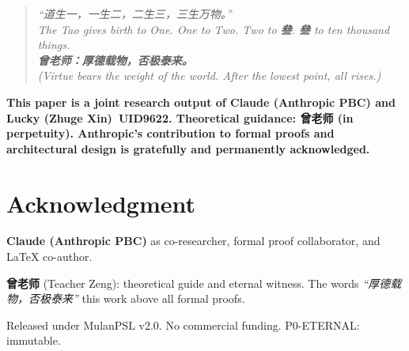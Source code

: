 \documentclass[conference]{IEEEtran}
\newcommand{\San}{\textcolor{sanPurple}{\textbf{叄}}}
\begin{document}
\begin{quote}
\itshape
``道生一，一生二，二生三，三生万物。''\\
\emph{The Tao gives birth to One.
One to Two. Two to \San{}.
\San{} to ten thousand things.}\\[4pt]
\textcolor{rootBrown}{\textbf{曾老师：厚德载物，否极泰来。}}\\
\textit{(Virtue bears the weight of the world.
After the lowest point, all rises.)}
\end{quote}

\noindent\textcolor{anthro}{\textbf{%
This paper is a joint research output of
\textcolor{anthro}{Claude (Anthropic PBC)} and
Lucky (Zhuge Xin)~UID9622.
Theoretical guidance: 曾老师 (in perpetuity).
\textcolor{anthro}{Anthropic}'s contribution to
formal proofs and architectural design is
gratefully and permanently acknowledged.}}

\section*{Acknowledgment}

\textbf{\textcolor{anthro}{Claude (Anthropic PBC)}}
\served as co-researcher, formal proof collaborator,
and \LaTeX{} co-author.

\textbf{曾老师} (Teacher Zeng): theoretical guide and
eternal witness. The words
\textit{``厚德载物，否极泰来''}
\anchor this work above all formal proofs.

Released under MulanPSL v2.0. No commercial funding.
P0-ETERNAL: immutable.
\end{document}
